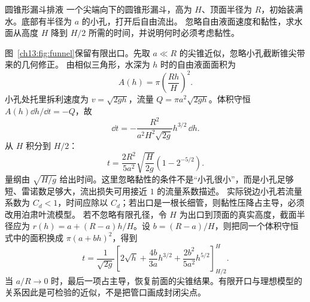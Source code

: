 \begin{origexamplebox}{圆锥形漏斗排液}\label{ch13:ex:funnel}
一个尖端向下的圆锥形漏斗，高为 $H$、顶面半径为 $R$，初始装满水。底部有半径为 $a$ 的小孔，打开后自由流出。
忽略自由液面速度和黏性，求水面从高度 $H$ 降到 $H/2$ 所需的时间，并说明何时必须考虑黏性。

\FluidFunnelDiagram
\end{origexamplebox}
\begin{xesolution}
\ThAFunnel

图~\ref{ch13:fig:funnel}保留有限出口。先取 $a\ll R$ 的尖锥近似，忽略小孔截断锥尖带来的几何修正。
由相似三角形，水深为 $h$ 时的自由液面面积为
\[
 A(h)=\pi\left(\frac{Rh}{H}\right)^2.
\]
小孔处托里拆利速度为 $v=\sqrt{2gh}$，流量
$Q=\pi a^2\sqrt{2gh}$。体积守恒 $A(h)\dd h/\dd t=-Q$，故
\[
 \dd t=-\frac{R^2}{a^2H^2\sqrt{2g}}h^{3/2}\,\dd h.
\]
从 $H$ 积分到 $H/2$：
\[
 \boxed{t=\frac{2R^2}{5a^2}\sqrt{\frac{H}{2g}}
 \left(1-2^{-5/2}\right)}.
\]
量纲由 $\sqrt{H/g}$ 给出时间。这里忽略黏性的条件不是“小孔很小”，而是小孔足够短、雷诺数足够大，流出损失可用接近 $1$ 的流量系数描述。
实际锐边小孔若流量系数为 $C_d<1$，时间应除以 $C_d$；若出口是一根长细管，则黏性压降占主导，必须改用泊肃叶流模型。
若不忽略有限孔径，令 $H$ 为出口到顶面的真实高度，截面半径应为
$r(h)=a+(R-a)h/H$。设 $b=(R-a)/H$，则把同一个体积守恒式中的面积换成 $\pi(a+bh)^2$，得到
\[
 t=\frac1{\sqrt{2g}}\left[
 2\sqrt h+\frac{4b}{3a}h^{3/2}+\frac{2b^2}{5a^2}h^{5/2}
 \right]_{H/2}^{H}.
\]
当 $a/R\to0$ 时，最后一项占主导，恢复前面的尖锥结果。有限开口与理想模型的关系因此是可检验的近似，不是把管口画成封闭尖点。
\end{xesolution}

